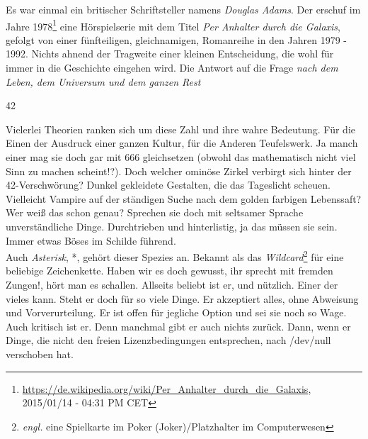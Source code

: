 



Es war einmal ein britischer Schriftsteller namens \textit{Douglas Adams}. Der erschuf im Jahre 1978\footnote{\url{https://de.wikipedia.org/wiki/Per_Anhalter_durch_die_Galaxis}, 2015/01/14 - 04:31 PM CET} eine Hörspielserie mit dem Titel \textit{Per Anhalter durch die Galaxis}, gefolgt von einer fünfteiligen, gleichnamigen, Romanreihe in den Jahren 1979 - 1992. Nichts ahnend der Tragweite einer kleinen Entscheidung, die wohl für immer in die Geschichte eingehen wird. Die Antwort auf die Frage \textit{nach dem Leben, dem Universum und dem ganzen Rest} 
\begin{center}{\huge 42}\end{center}
Vielerlei Theorien ranken sich um diese Zahl und ihre wahre Bedeutung. Für die Einen der Ausdruck einer ganzen Kultur, für die Anderen Teufelswerk. Ja manch einer mag sie doch gar mit 666 gleichsetzen (obwohl das mathematisch nicht viel Sinn zu machen scheint!?). Doch welcher ominöse Zirkel verbirgt sich hinter der 42-Verschwörung? Dunkel gekleidete Gestalten, die das Tageslicht scheuen. Vielleicht Vampire auf der ständigen Suche nach dem golden farbigen Lebenssaft? Wer weiß das schon genau? Sprechen sie doch mit seltsamer Sprache unverständliche Dinge. Durchtrieben und hinterlistig, ja das müssen sie sein. Immer etwas Böses im Schilde führend.
\\
Auch \textit{Asterisk}, *, gehört dieser Spezies an. Bekannt als das \textit{Wildcard}\footnote{\textit{engl.} eine Spielkarte im Poker (Joker)/Platzhalter im Computerwesen} für eine beliebige Zeichenkette. \glqq Haben wir es doch gewusst, ihr sprecht mit fremden Zungen!\grqq, hört man es schallen. Allseits beliebt ist er, und nützlich. Einer der vieles kann. Steht er doch für so viele Dinge. Er akzeptiert alles, ohne Abweisung und Vorverurteilung. Er ist offen für jegliche Option und sei sie noch so Wage. Auch kritisch ist er. Denn manchmal gibt er auch nichts zurück. Dann, wenn er Dinge, die nicht den freien Lizenzbedingungen entsprechen, nach /dev/null verschoben hat.
